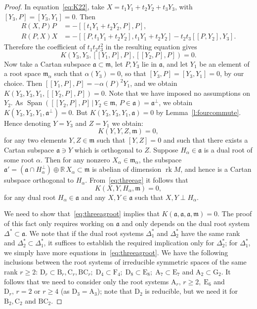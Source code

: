 \documentclass[12pt,reqno]{amsart}
\renewcommand \a{\alpha}
\newcommand \br{\mathbb{R}}
\newcommand \rk{\operatorname{rk}}
\newcommand \Span{\operatorname{Span}}
\newcommand\ag{\mathfrak a}
\newcommand\m{\mathfrak m}
\newcommand \<{\langle}
\renewcommand \>{\rangle}
\theoremstyle{definition}
\theoremstyle{remark}
\begin{document}
\begin{proof}
		In equation~\eqref{eq:K22}, take $X=t_1Y_1+t_2Y_2+t_3Y_3$, with $[Y_3,P] = [Y_3,Y_1]=0$. Then
		\[
		\begin{aligned}
			R(X,P)P &= -[[t_1Y_1+t_2Y_2,P],P],\\
			R(P,X)X &= -[[P,t_1Y_1+t_2Y_2],t_1Y_1+t_2Y_2]
			-t_2t_3[[P,Y_2],Y_3].
		\end{aligned}
		\]
		Therefore the coefficient of $t_1t_2t_3^2$ in the resulting equation gives
		\[
		K(Y_3,Y_3, [[Y_1,P],P], [[Y_2,P],P]) = 0.
		\]
		Now take a Cartan subspace $\ag \subset \m$, let $P, Y_3$ lie in $\ag$, and let $Y_1$ be an element of a root space $\m_\a$ such that $\a(Y_3) = 0$, so that $[Y_3,P] = [Y_3,Y_1]=0$, by our choice. Then $[[Y_1,P],P] = -\a(P)^2 Y_1$, and we obtain $K(Y_3,Y_3,Y_1, [[Y_2,P],P]) = 0$. Note that we have imposed no assumptions on $Y_2$. As $\Span([[Y_2,P],P] \, | \, Y_2 \in \m, \, P \in \ag) = \ag^\perp$, we obtain $K(Y_3,Y_3,Y_1, \ag^\perp) = 0$. But $K(Y_3,Y_3,Y_1, \ag) = 0$ by Lemma~\ref{l:fourcommute}. Hence denoting $Y=Y_3$ and $Z = Y_1$ we obtain:
		\begin{equation}\label{eq:threeag}
			K(Y,Y,Z,\m) = 0,
		\end{equation}
		for any two elements $Y,Z \in \m$ such that $[Y,Z] =0$ and such that there exists a Cartan subspace $\ag \ni Y$ which is orthogonal to $Z$. Suppose $H_\a \in \ag$ is a dual root of some root $\a$. Then for any nonzero $X_\a \in \m_\a$, the subspace $\ag' = (\ag \cap H_\a^\perp) \oplus \br \, X_\a \subset \m$ is abelian of dimension $\rk M$, and hence is a Cartan subspace orthogonal to $H_\a$. From~\eqref{eq:threeag} it follows that
		\begin{equation}\label{eq:threeagroot}
			K(X,Y,H_\a,\m) = 0,
		\end{equation}
for any dual root $H_\a \in \ag$ and any $X, Y \in \ag$ such that $X,Y \perp H_\a$.

We need to show that~\eqref{eq:threeagroot} implies that $K(\ag,\ag,\ag,\m) = 0$. The proof of this fact only requires working on $\ag$ and only depends on the dual root system $\Delta^* \subset \ag$. We note that if the dual root systems $\Delta^*_1$ and  $\Delta^*_2$ have the same rank and  $\Delta^*_2 \subset \Delta^*_1$, it suffices to establish the required implication only for  $\Delta^*_2$; for $\Delta^*_1$, we simply have more equations in~\eqref{eq:threeagroot}. We have the following inclusions between the root systems of irreducible symmetric spaces of the same rank $r \ge 2$: $\mathrm{D}_r \subset \mathrm{B}_r, \mathrm{C}_r, \mathrm{BC}_r; \; \mathrm{D}_4 \subset \mathrm{F}_4; \;  \mathrm{D}_8 \subset \mathrm{E}_8; \; \mathrm{A}_7 \subset \mathrm{E}_7$ and $\mathrm{A}_2 \subset \mathrm{G}_2$. It follows that we need to consider only the root systems $\mathrm{A}_r, \, r \ge 2, \; \mathrm{E}_6$ and $\mathrm{D}_r, \, r=2$ or $r \ge 4$ (as $\mathrm{D}_3 = \mathrm{A}_3$); note that $\mathrm{D}_2$ is reducible, but we need it for $\mathrm{B}_2, \mathrm{C}_2$ and $\mathrm{BC}_2$.


\end{proof}
\end{document}
